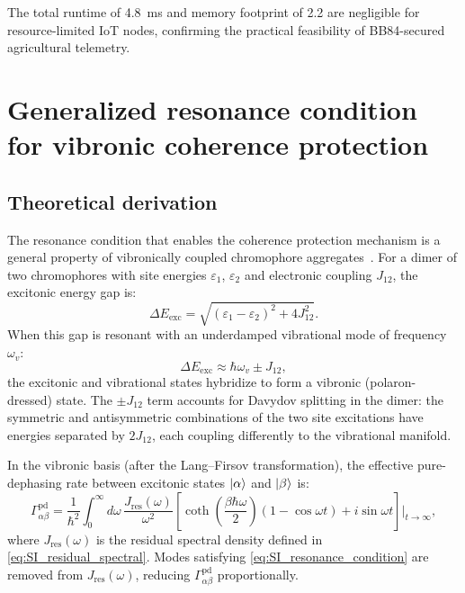 \documentclass[11pt,a4paper]{article}
\begin{document}
The total runtime of \qty{4.8}{\ms} and memory footprint of \qty{2.2}{\kB} are negligible for resource-limited IoT nodes, confirming the practical feasibility of BB84-secured agricultural telemetry.


\section{Generalized resonance condition for vibronic coherence protection}
\label{SI-sec:resonance}

\subsection{Theoretical derivation}

The resonance condition that enables the coherence protection mechanism is a general property of vibronically coupled chromophore aggregates~\cite{Chin2013,Christensson2012}.
For a dimer of two chromophores with site energies $\varepsilon_1$, $\varepsilon_2$ and electronic coupling $J_{12}$, the excitonic energy gap is:
\begin{equation}
\Delta E_{\mathrm{exc}} = \sqrt{(\varepsilon_1 - \varepsilon_2)^2 + 4J_{12}^2}.
\label{eq:SI_exciton_gap}
\end{equation}
When this gap is resonant with an underdamped vibrational mode of frequency $\omega_v$:
\begin{equation}
\Delta E_{\mathrm{exc}} \approx \hbar\omega_v \pm J_{12},
\label{eq:SI_resonance_condition}
\end{equation}
the excitonic and vibrational states hybridize to form a vibronic (polaron-dressed) state.
The $\pm J_{12}$ term accounts for Davydov splitting in the dimer: the symmetric and antisymmetric combinations of the two site excitations have energies separated by $2J_{12}$, each coupling differently to the vibrational manifold.

In the vibronic basis (after the Lang--Firsov transformation), the effective pure-dephasing rate between excitonic states $\ket{\alpha}$ and $\ket{\beta}$ is:
\begin{equation}
\Gamma_{\alpha\beta}^{\mathrm{pd}} = \frac{1}{\hbar^2} \int_0^\infty d\omega\, \frac{J_{\mathrm{res}}(\omega)}{\omega^2} \left[\coth\!\left(\frac{\beta\hbar\omega}{2}\right)(1 - \cos\omega t) + i\sin\omega t\right]\bigg|_{t\to\infty},
\label{eq:SI_dephasing_rate}
\end{equation}
where $J_{\mathrm{res}}(\omega)$ is the residual spectral density defined in \cref{eq:SI_residual_spectral}.
Modes satisfying \cref{eq:SI_resonance_condition} are removed from $J_{\mathrm{res}}(\omega)$, reducing $\Gamma_{\alpha\beta}^{\mathrm{pd}}$ proportionally.
\end{document}
